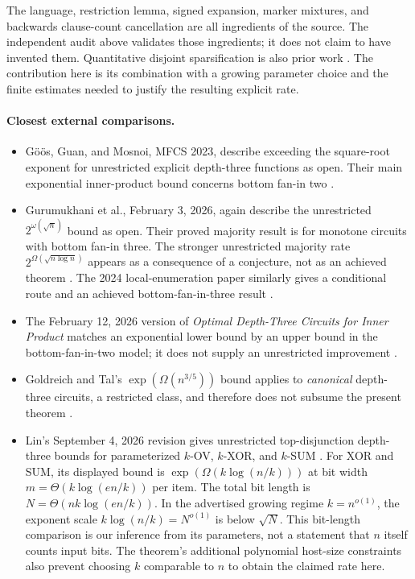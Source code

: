 \documentclass[11pt]{article}
\begin{document}
The language, restriction lemma, signed expansion, marker mixtures, and
backwards clause-count cancellation are all ingredients of the source.
The independent audit above validates those ingredients; it does not claim
to have invented them. Quantitative disjoint sparsification is also prior
work \cite{CIP,DHMTW,Williams}. The contribution here is its combination
with a growing parameter choice and the finite estimates needed to justify
the resulting explicit rate.

\paragraph{Closest external comparisons.}
\begin{itemize}
\item G\"o\"os, Guan, and Mosnoi, MFCS 2023, describe exceeding the
square-root exponent for unrestricted explicit depth-three functions as
open. Their main exponential inner-product bound concerns bottom fan-in
two \cite[pp.~51:1--51:2]{GGM23}.
\item Gurumukhani et al., February 3, 2026, again describe the unrestricted
$2^{\omega(\sqrt n)}$ bound as open. Their proved majority result is for
monotone circuits with bottom fan-in three. The stronger unrestricted
majority rate $2^{\Omega(\sqrt{n\log n})}$ appears as a consequence of
a conjecture, not as an achieved theorem \cite[Section~1]{GKKPRST}.
The 2024 local-enumeration paper similarly gives a conditional route and
an achieved bottom-fan-in-three result \cite{GPPST24}.
\item The February 12, 2026 version of \emph{Optimal Depth-Three Circuits
for Inner Product} matches an exponential lower bound by an upper bound
in the bottom-fan-in-two model; it does not supply an unrestricted
improvement \cite{GKPRT26IP}.
\item Goldreich and Tal's $\exp(\Omega(n^{3/5}))$ bound applies to
\emph{canonical} depth-three circuits, a restricted class, and therefore
does not subsume the present theorem \cite[Corollary~1.4]{GT15}.
\item Lin's September 4, 2026 revision gives unrestricted top-disjunction
depth-three bounds for parameterized $k$-OV, $k$-XOR, and $k$-SUM
\cite{Lin26}. For XOR and SUM, its displayed bound is
$\exp(\Omega(k\log(n/k)))$ at bit width
$m=\Theta(k\log(en/k))$ per item. The total bit length is
$N=\Theta(nk\log(en/k))$. In the advertised growing regime
$k=n^{o(1)}$, the exponent scale $k\log(n/k)=N^{o(1)}$ is below
$\sqrt N$. This bit-length comparison is our inference from its
parameters, not a statement that $n$ itself counts input bits. The
theorem's additional polynomial host-size constraints also prevent
choosing $k$ comparable to $n$ to obtain the claimed rate here.
\end{itemize}
\end{document}
